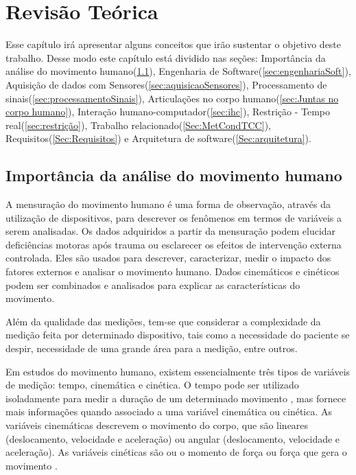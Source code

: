 
\chapter[Revisão Teórica]{Revisão Teórica}
  Esse capítulo irá apresentar alguns conceitos que irão sustentar o objetivo deste trabalho.
Desse modo este capítulo está dividido nas seções: Importância da análise do movimento humano(\ref{sec:importancia}),
Engenharia de Software(\ref{sec:engenhariaSoft}), Aquisição de dados com Sensores(\ref{sec:aquisicaoSensores}),
Processamento de sinais(\ref{sec:processamentoSinais}), Articulações no corpo humano(\ref{sec:Juntas no corpo humano}), Interação humano-computador(\ref{sec:ihc}), Restrição - Tempo real(\ref{sec:restrição}),
Trabalho relacionado(\ref{Sec:MetCondTCC}), Requisitos(\ref{Sec:Requisitos}) e Arquitetura de software(\ref{Sec:arquitetura}).

\section{Importância da análise do movimento humano}\label{sec:importancia}

A mensuração do movimento humano é uma forma de observação, através da utilização
de dispositivos, para descrever os fenômenos em termos de variáveis a serem analisadas.
Os dados adquiridos a partir da mensuração podem elucidar deficiências
motoras após trauma ou esclarecer os efeitos de intervenção externa controlada.
Eles são usados para descrever, caracterizar, medir o impacto dos
fatores externos e analisar o movimento humano. Dados cinemáticos e cinéticos podem ser combinados
e analisados para explicar as características do movimento.

Além da qualidade das medições, tem-se que considerar a complexidade da medição
feita por determinado dispositivo, tais como a necessidade do paciente se despir,
necessidade de uma grande área para a medição, entre outros.

Em estudos do movimento humano, existem essencialmente três tipos de variáveis de medição: tempo,
cinemática e cinética. O tempo pode ser utilizado isoladamente para medir a duração de um determinado movimento
, mas fornece mais informações quando associado a uma variável cinemática ou cinética.
As variáveis cinemáticas descrevem o movimento do corpo, que são lineares (deslocamento,
velocidade e aceleração) ou angular (deslocamento, velocidade e aceleração).
 As variáveis cinéticas são ou o momento de força ou força que gera o movimento \cite{roberto}.

